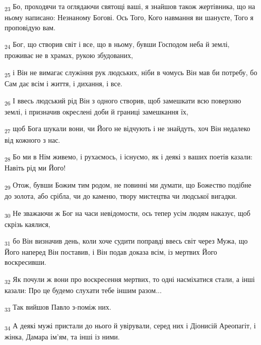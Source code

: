 \begin{tcolorbox}
\textsubscript{23} Бо, проходячи та оглядаючи святощі ваші, я знайшов також жертівника, що на ньому написано: Незнаному Богові. Ось Того, Кого навмання ви шануєте, Того я проповідую вам.
\end{tcolorbox}
\begin{tcolorbox}
\textsubscript{24} Бог, що створив світ і все, що в ньому, бувши Господом неба й землі, проживає не в храмах, рукою збудованих,
\end{tcolorbox}
\begin{tcolorbox}
\textsubscript{25} і Він не вимагає служіння рук людських, ніби в чомусь Він мав би потребу, бо Сам дає всім і життя, і дихання, і все.
\end{tcolorbox}
\begin{tcolorbox}
\textsubscript{26} І ввесь людський рід Він з одного створив, щоб замешкати всю поверхню землі, і призначив окреслені доби й границі замешкання їх,
\end{tcolorbox}
\begin{tcolorbox}
\textsubscript{27} щоб Бога шукали вони, чи Його не відчують і не знайдуть, хоч Він недалеко від кожного з нас.
\end{tcolorbox}
\begin{tcolorbox}
\textsubscript{28} Бо ми в Нім живемо, і рухаємось, і існуємо, як і деякі з ваших поетів казали: Навіть рід ми Його!
\end{tcolorbox}
\begin{tcolorbox}
\textsubscript{29} Отож, бувши Божим тим родом, не повинні ми думати, що Божество подібне до золота, або срібла, чи до каменю, твору мистецтва чи людської вигадки.
\end{tcolorbox}
\begin{tcolorbox}
\textsubscript{30} Не зважаючи ж Бог на часи невідомости, ось тепер усім людям наказує, щоб скрізь каялися,
\end{tcolorbox}
\begin{tcolorbox}
\textsubscript{31} бо Він визначив день, коли хоче судити поправді ввесь світ через Мужа, що Його наперед Він поставив, і Він подав доказа всім, із мертвих Його воскресивши.
\end{tcolorbox}
\begin{tcolorbox}
\textsubscript{32} Як почули ж вони про воскресення мертвих, то одні насміхатися стали, а інші казали: Про це будемо слухати тебе іншим разом...
\end{tcolorbox}
\begin{tcolorbox}
\textsubscript{33} Так вийшов Павло з-поміж них.
\end{tcolorbox}
\begin{tcolorbox}
\textsubscript{34} А деякі мужі пристали до нього й увірували, серед них і Діонисій Ареопагіт, і жінка, Дамара ім'ям, та інші із ними.
\end{tcolorbox}
